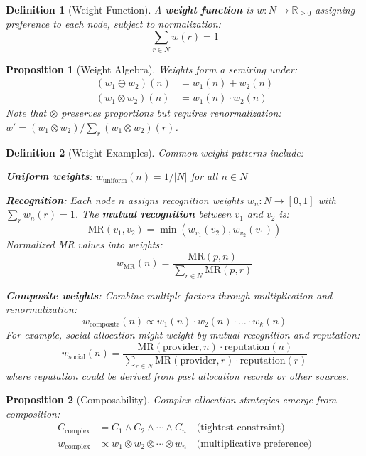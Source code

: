 \documentclass[11pt]{article}
\newtheorem{definition}{Definition}
\newtheorem{proposition}{Proposition}
\begin{document}
\begin{definition}[Weight Function]
A \textbf{weight function} is $w: N \to \mathbb{R}_{\geq 0}$ assigning preference to each node, subject to normalization:
\[
\sum_{r \in N} w(r) = 1
\]
\end{definition}

\begin{proposition}[Weight Algebra]
Weights form a semiring under:
\begin{align}
(w_1 \oplus w_2)(n) &= w_1(n) + w_2(n) \\
(w_1 \otimes w_2)(n) &= w_1(n) \cdot w_2(n)
\end{align}
Note that $\otimes$ preserves proportions but requires renormalization: $w' = (w_1 \otimes w_2) / \sum_r (w_1 \otimes w_2)(r)$.
\end{proposition}

\begin{definition}[Weight Examples]
Common weight patterns include:

\textbf{Uniform weights}: $w_{\text{uniform}}(n) = 1/|N|$ for all $n \in N$

\textbf{Recognition}: Each node $n$ assigns recognition weights $w_n: N \to [0,1]$ with $\sum_r w_n(r) = 1$. The \textbf{mutual recognition} between $v_1$ and $v_2$ is:
\[
\text{MR}(v_1, v_2) = \min(w_{v_1}(v_2), w_{v_2}(v_1))
\]
Normalized MR values into weights:
\[
w_{\text{MR}}(n) = \frac{\text{MR}(p, n)}{\sum_{r \in N} \text{MR}(p, r)}
\]

\textbf{Composite weights}: Combine multiple factors through multiplication and renormalization:
\[
w_{\text{composite}}(n) \propto w_1(n) \cdot w_2(n) \cdot \ldots \cdot w_k(n)
\]
For example, social allocation might weight by mutual recognition and reputation:
\[
w_{\text{social}}(n) = \frac{\text{MR}(\text{provider}, n) \cdot \text{reputation}(n)}{\sum_{r \in N} \text{MR}(\text{provider}, r) \cdot \text{reputation}(r)}
\]
where reputation could be derived from past allocation records or other sources.
\end{definition}

\begin{proposition}[Composability]
Complex allocation strategies emerge from composition:
\begin{align}
C_{\text{complex}} &= C_1 \wedge C_2 \wedge \cdots \wedge C_n \quad \text{(tightest constraint)} \\
w_{\text{complex}} &\propto w_1 \otimes w_2 \otimes \cdots \otimes w_n \quad \text{(multiplicative preference)}
\end{align}
\end{proposition}
\end{document}
